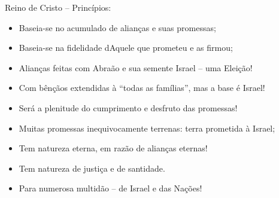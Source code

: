 \documentclass[12pt,aspectratio=169]{beamer}
\newcommand{\ORA}[1]{{\textcolor{TXred!50!TXyel}{#1}}}
\newcommand{\YEL}[1]{{\textcolor{TXyel}{#1}}}
\newcommand{\GRE}[1]{{\textcolor{TXgre}{#1}}}
\newcommand{\CYA}[1]{{\textcolor{TXcya}{#1}}}
\newcommand{\BLU}[1]{{\textcolor{TXblu}{#1}}}
\newcommand{\MAG}[1]{{\textcolor{TXmag}{#1}}}
\begin{document}
    \begin{frame}{\YEL{Reino de Cristo} -- Princípios:}
        \begin{itemize}
            \item<1-> Baseia-se no \YEL{acumulado} de \GRE{alianças} e suas \ORA{promessas};
            \item<1-> Baseia-se na \CYA{fidelidade} dAquele que prometeu e as firmou;
            \item<1-> Alianças feitas com Abraão e sua semente \BLU{Israel} -- uma \YEL{Eleição}!
            \item<1-> Com bênçãos extendidas à ``\YEL{todas as famílias}'', mas a base é
                \BLU{Israel}!
            \item<1-> Será a \YEL{plenitude do cumprimento} e desfruto das promessas!
            \item<1-> Muitas promessas inequivocamente \ORA{terrenas}: \ORA{terra} prometida à
                \BLU{Israel};
            \item<1-> Tem natureza \MAG{eterna}, em razão de alianças \MAG{eternas}!
            \item<1-> Tem natureza de \YEL{justiça} e de \YEL{santidade}.
            \item<1-> Para \GRE{numerosa multidão} -- de \BLU{Israel} e das Nações!
        \end{itemize}
    \end{frame}

\end{document}
